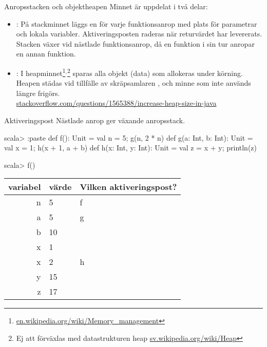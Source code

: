 \begin{Slide}{Anropsstacken och objektheapen}\SlideFontSmall
Minnet är uppdelat i två delar:
\begin{itemize}
\item {}: På stackminnet läggs en   för varje funktionsanrop med plats för parametrar och lokala variabler. Aktiveringsposten raderas när returvärdet har levererats. Stacken växer vid nästlade funktionsanrop, då en funktion i sin tur anropar en annan funktion. 

\item {}: I heapminnet\footnote{\href{https://en.wikipedia.org/wiki/Memory_management}{en.wikipedia.org/wiki/Memory\_management}}$^{,}$\footnote{Ej att förväxlas med datastrukturen heap  \href{https://sv.wikipedia.org/wiki/Heap}{sv.wikipedia.org/wiki/Heap}} sparas alla objekt (data) som allokeras under körning. Heapen städas vid tillfälle av skräpsamlaren , och minne som inte används längre frigörs. \\\vspace{0.5em}
\href{http://stackoverflow.com/questions/1565388/increase-heap-size-in-java}{stackoverflow.com/questions/1565388/increase-heap-size-in-java}
\end{itemize}
\end{Slide} 


\begin{Slide}{Aktiveringspost}\SlideFontSmall
Nästlade anrop ger växande anropsstack.
\begin{REPL}
scala> :paste
def f(): Unit = { val n = 5; g(n, 2 * n) }
def g(a: Int, b: Int): Unit = { val x = 1; h(x + 1, a + b) }
def h(x: Int, y: Int): Unit = { val z = x + y; println(z) }

scala> f()

\end{REPL}

\pause
{}

\begin{tabular}{|r | l | l |} \hline

variabel & värde & Vilken aktiveringspost? \\ \hline \hline
\pause
 n & 5 & f \\ \hline
 \pause 
 a & 5 & g \\
 b & 10 &  \\
 x & 1  &  \\  \hline
 \pause 
 x & 2  & h \\
 y & 15 &  \\
 z & 17 & \\ 
\end{tabular}
\end{Slide} 


